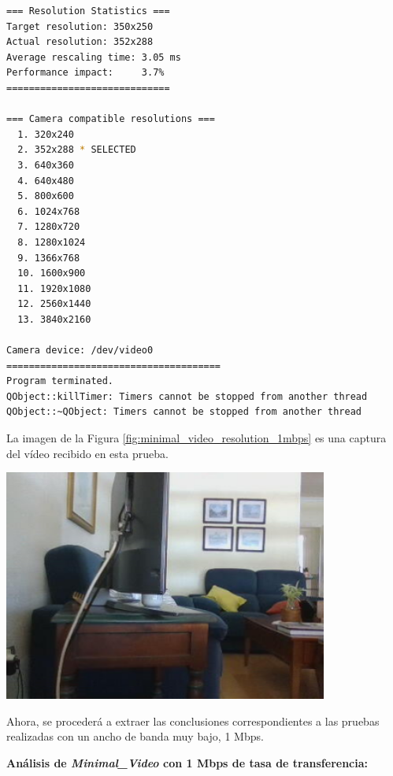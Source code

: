 \begin{lstlisting}[language=bash,basicstyle=\ttfamily\tiny]
=== Resolution Statistics ===
Target resolution: 350x250
Actual resolution: 352x288
Average rescaling time: 3.05 ms
Performance impact:     3.7%
=============================

=== Camera compatible resolutions ===
  1. 320x240
  2. 352x288 * SELECTED
  3. 640x360
  4. 640x480
  5. 800x600
  6. 1024x768
  7. 1280x720
  8. 1280x1024
  9. 1366x768
  10. 1600x900
  11. 1920x1080
  12. 2560x1440
  13. 3840x2160

Camera device: /dev/video0
======================================
Program terminated.
QObject::killTimer: Timers cannot be stopped from another thread
QObject::~QObject: Timers cannot be stopped from another thread
\end{lstlisting}
\vspace{\baselineskip}

\newpage

La imagen de la Figura \ref{fig:minimal_video_resolution_1mbps} es una captura del vídeo recibido en esta prueba.
\begin{center}
  \includegraphics[width = 0.8\textwidth]{images/VideoRecibido1.3.png}
  \label{fig:minimal_video_resolution_1mbps}
\end{center}

\newpage

Ahora, se procederá a extraer las conclusiones correspondientes a las pruebas realizadas con un ancho de banda muy bajo, 1 Mbps.

\vspace{\baselineskip}

\textbf{Análisis de \textit{Minimal\_Video} con 1 Mbps de tasa de transferencia:}
\vspace{\baselineskip}

